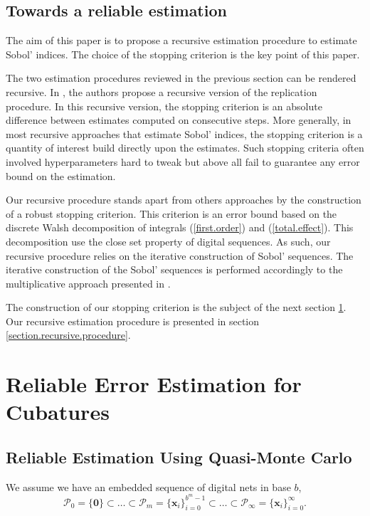 \documentclass[]{elsarticle}
\theoremstyle{definition}
\newcommand{\bvec}[1]{\boldsymbol{#1}}
\newcommand{\vx}{\bvec{x}}
\begin{document}
\subsection{Towards a reliable estimation}
The aim of this paper is to propose a recursive estimation procedure to estimate Sobol' indices. The choice of the stopping criterion is the key point of this paper. 

The two estimation procedures reviewed in the previous section can be rendered recursive. In \cite{Gilquin16}, the authors propose a recursive version of the replication procedure. In this recursive version, the stopping criterion is an absolute difference between estimates computed on consecutive steps. More generally, in most recursive approaches that estimate Sobol' indices, the stopping criterion is a quantity of interest build directly upon the estimates. Such stopping criteria often involved hyperparameters hard to tweak but above all fail to guarantee any error bound on the estimation. 
\bigskip

Our recursive procedure stands apart from others approaches by the construction of a robust stopping criterion. This criterion is an error bound based on the discrete Walsh decomposition of integrals (\ref{first.order}) and (\ref{total.effect}). This decomposition use the close set property of digital sequences. As such, our recursive procedure relies on the iterative construction of Sobol' sequences. The iterative construction of the Sobol' sequences is performed accordingly to the multiplicative  approach presented in \cite{crass}.

The construction of our stopping criterion is the subject of the next section \ref{section.error}. Our recursive estimation procedure is presented in section \ref{section.recursive.procedure}.


\section{Reliable Error Estimation for Cubatures}
\label{section.error} 

\subsection{Reliable Estimation Using Quasi-Monte Carlo}

We assume we have an embedded sequence of digital nets in base $b$,
\[
\mathcal{P}_0=\{\bvec{0}\}\subset\dots\subset\mathcal{P}_m=\{\vx_i\}_{i=0}^{b^m-1}\subset\dots\subset\mathcal{P}_\infty=\{\vx_i\}_{i=0}^{\infty}.
\]
\end{document}
